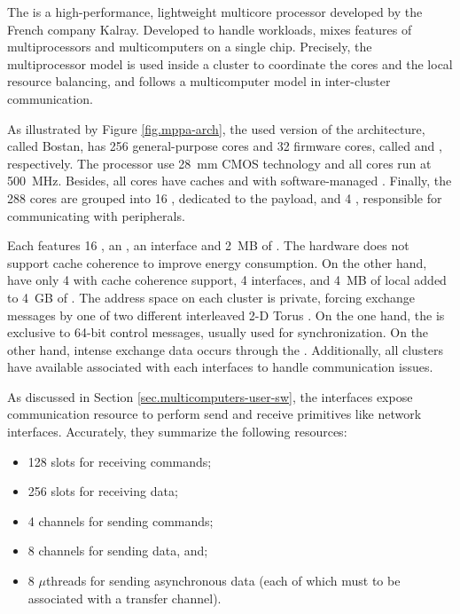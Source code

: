 	The \mppa is a high-performance, lightweight multicore processor
	developed by the French company Kalray.
	Developed to handle \mimd workloads, \mppa mixes features of
	multiprocessors and multicomputers on a single chip.
	Precisely, the multiprocessor model is used inside a cluster
	to coordinate the cores and the local resource balancing, and
	follows a multicomputer model in inter-cluster communication.

	As illustrated by Figure \ref{fig.mppa-arch}, the used version of
	the architecture, called Bostan, has 256 general-purpose cores and
	32 firmware cores, called \pes and \rmans, respectively.
	The processor use 28~mm CMOS technology and all cores run at 500~MHz.
	Besides, all cores have caches and \mmus with software-managed \tlbs.
	Finally, the 288 cores are grouped into 16 \cclusters, dedicated to
	the payload, and 4 \ioclusters, responsible for communicating with peripherals.

	Each \ccluster features 16 \pes, an \rman, an \noc interface and 2~MB of \sram.
	The hardware does not support cache coherence to improve energy consumption.
	On the other hand, \ioclusters have only 4 \rmans with cache coherence support,
	4 \noc interfaces, and 4~MB of local \sram added to 4~GB of \dram.
	The address space on each cluster is private, forcing exchange messages
	by one of two different interleaved 2-D Torus \nocs.
	On the one hand, the \cnoc is exclusive to 64-bit control messages,
	usually used for synchronization.
	On the other hand, intense exchange data occurs through the \dnoc.
	Additionally, all clusters have available \dmas associated with each
	\noc interfaces to handle communication issues.

	As discussed in Section \ref{sec.multicomputers-user-sw}, the \noc interfaces
	expose communication resource to perform send and receive primitives
	like network interfaces.
	Accurately, they summarize the following resources:

	\begin{itemize}
		\item 128 slots for receiving commands;
		\item 256 slots for receiving data;
		\item 4 channels for sending commands;
		\item 8 channels for sending data, and;
		\item 8 $\mu$threads for sending asynchronous data (each of which must
			to be associated with a transfer channel).
	\end{itemize}


